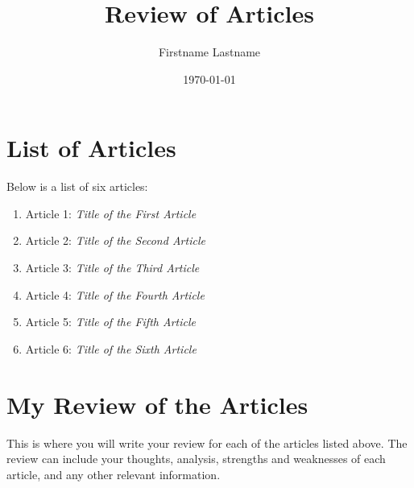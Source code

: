 \documentclass[a4paper,12pt]{article}
\title{Review of Articles}
\author{Firstname Lastname}
\date{\today}
\begin{document}
\maketitle

\section{List of Articles}
Below is a list of six articles:

\begin{enumerate}
    \item Article 1: \textit{Title of the First Article}
    \item Article 2: \textit{Title of the Second Article}
    \item Article 3: \textit{Title of the Third Article}
    \item Article 4: \textit{Title of the Fourth Article}
    \item Article 5: \textit{Title of the Fifth Article}
    \item Article 6: \textit{Title of the Sixth Article}
\end{enumerate}

\newpage

\section{My Review of the Articles}
This is where you will write your review for each of the articles listed above. The review can include your thoughts, analysis, strengths and weaknesses of each article, and any other relevant information.
\end{document}
